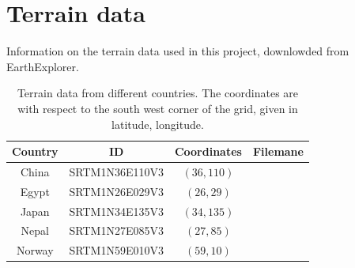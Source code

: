 \appendix
\section{Terrain data}\label{ap:terrain_data}
Information on the terrain data used in this project, downlowded from EarthExplorer.
\begin{table}[h]
    \centering
    \begin{tabular}{cccc}
        \hline
        Country & ID & Coordinates & Filemane \\
        \hline
        China & SRTM1N36E110V3 & $(36, 110)$ &  \\
        Egypt & SRTM1N26E029V3 & $(26, 29)$ & \\
        Japan & SRTM1N34E135V3 & $(34, 135)$ & \\
        Nepal & SRTM1N27E085V3 & $(27, 85)$ & \\
        Norway & SRTM1N59E010V3 & $(59, 10)$ & \\
        \hline
    \end{tabular}
    \caption{Terrain data from different countries. The coordinates are with respect to the south west corner of the grid, given in latitude, longitude.}
    \label{tab:terrain_data}
\end{table}


